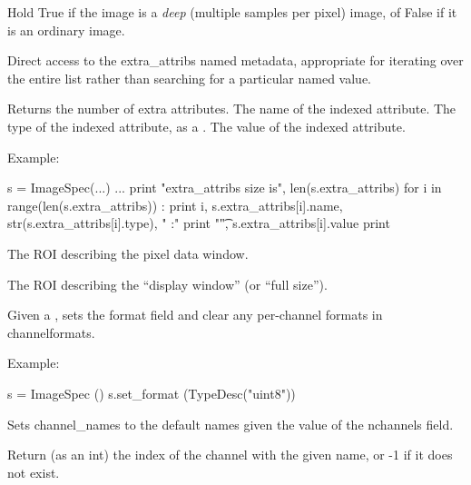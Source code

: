 Hold {\cf True} if the image is a \emph{deep} (multiple samples per pixel)
image, of {\cf False} if it is an ordinary image.
\apiend

Direct access to the {\cf extra_attribs} named metadata, appropriate for
iterating over the entire list rather than searching for a particular named
value.

\vspace{-10pt}
\vspace{10pt}
Returns the number of extra attributes.
\apiend
\vspace{-24pt}
\vspace{10pt}
The name of the indexed attribute.
\apiend
\vspace{-24pt}
\vspace{10pt}
The type of the indexed attribute, as a \TypeDesc.
\apiend
\vspace{-24pt}
\vspace{10pt}
The value of the indexed attribute.
\apiend

\noindent Example:
\begin{code}
    s = ImageSpec(...)
    ...
    print "extra_attribs size is", len(s.extra_attribs)
    for i in range(len(s.extra_attribs)) :
        print i, s.extra_attribs[i].name, str(s.extra_attribs[i].type), " :"
        print "\t", s.extra_attribs[i].value
    print
\end{code}
\apiend

\NEW %
The ROI describing the pixel data window.
\apiend

\NEW %
The ROI describing the ``display window'' (or ``full size'').
\apiend

Given a \TypeDesc, sets the {\cf format} field and
clear any per-channel formats in {\cf channelformats}.

\noindent Example:
\begin{code}
    s = ImageSpec ()
    s.set_format (TypeDesc("uint8"))
\end{code}
\apiend

Sets {\cf channel_names} to the default names given the value of
the {\cf nchannels} field.
\apiend

Return (as an int) the index of the channel with the given name, or -1
if it does not exist.
\apiend

